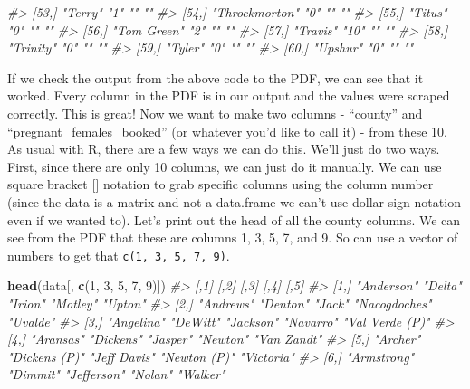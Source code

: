 \documentclass[
  12pt,
]{book}
\newenvironment{Shaded}{\begin{snugshade}}{\end{snugshade}}
\newcommand{\CommentTok}[1]{\textcolor[rgb]{0.37,0.37,0.37}{\textit{#1}}}
\newcommand{\DecValTok}[1]{\textcolor[rgb]{0.06,0.06,0.06}{#1}}
\newcommand{\KeywordTok}[1]{\textcolor[rgb]{0.27,0.27,0.27}{\textbf{#1}}}
\newcommand{\NormalTok}[1]{#1}
\begin{document}
\begin{Shaded}
\begin{Highlighting}[]
\CommentTok{\#\textgreater{} [53,] "Terry"         "1"  ""              ""   }
\CommentTok{\#\textgreater{} [54,] "Throckmorton"  "0"  ""              ""   }
\CommentTok{\#\textgreater{} [55,] "Titus"         "0"  ""              ""   }
\CommentTok{\#\textgreater{} [56,] "Tom Green"     "2"  ""              ""   }
\CommentTok{\#\textgreater{} [57,] "Travis"        "10" ""              ""   }
\CommentTok{\#\textgreater{} [58,] "Trinity"       "0"  ""              ""   }
\CommentTok{\#\textgreater{} [59,] "Tyler"         "0"  ""              ""   }
\CommentTok{\#\textgreater{} [60,] "Upshur"        "0"  ""              ""}
\end{Highlighting}
\end{Shaded}

If we check the output from the above code to the PDF, we can see that it worked. Every column in the PDF is in our output and the values were scraped correctly. This is great! Now we want to make two columns - ``county'' and ``pregnant\_females\_booked'' (or whatever you'd like to call it) - from these 10. As usual with R, there are a few ways we can do this. We'll just do two ways. First, since there are only 10 columns, we can just do it manually. We can use square bracket {[}{]} notation to grab specific columns using the column number (since the data is a matrix and not a data.frame we can't use dollar sign notation even if we wanted to). Let's print out the head of all the county columns. We can see from the PDF that these are columns 1, 3, 5, 7, and 9. So can use a vector of numbers to get that \texttt{c(1,\ 3,\ 5,\ 7,\ 9)}.

\begin{Shaded}
\begin{Highlighting}[]
\KeywordTok{head}\NormalTok{(data[, }\KeywordTok{c}\NormalTok{(}\DecValTok{1}\NormalTok{, }\DecValTok{3}\NormalTok{, }\DecValTok{5}\NormalTok{, }\DecValTok{7}\NormalTok{, }\DecValTok{9}\NormalTok{)])}
\CommentTok{\#\textgreater{}      [,1]        [,2]          [,3]         [,4]          [,5]           }
\CommentTok{\#\textgreater{} [1,] "Anderson"  "Delta"       "Irion"      "Motley"      "Upton"        }
\CommentTok{\#\textgreater{} [2,] "Andrews"   "Denton"      "Jack"       "Nacogdoches" "Uvalde"       }
\CommentTok{\#\textgreater{} [3,] "Angelina"  "DeWitt"      "Jackson"    "Navarro"     "Val Verde (P)"}
\CommentTok{\#\textgreater{} [4,] "Aransas"   "Dickens"     "Jasper"     "Newton"      "Van Zandt"    }
\CommentTok{\#\textgreater{} [5,] "Archer"    "Dickens (P)" "Jeff Davis" "Newton (P)"  "Victoria"     }
\CommentTok{\#\textgreater{} [6,] "Armstrong" "Dimmit"      "Jefferson"  "Nolan"       "Walker"}
\end{Highlighting}
\end{Shaded}
\end{document}
